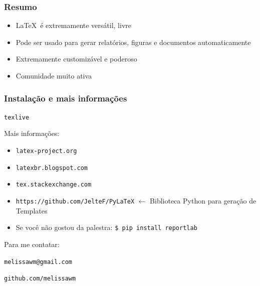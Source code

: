 \documentclass{beamer}
\begin{document}
\begin{frame}
   \frametitle{Resumo}
   \begin{itemize}
      \item \LaTeX\ é extremamente versátil, livre
      \item<2-> Pode ser usado para gerar relatórios, figuras e documentos automaticamente
      \item<3-> Extremamente customizável e poderoso
      \item<4-> Comunidade muito ativa
   \end{itemize}
\end{frame}
\begin{frame}[fragile]
   \frametitle{Instalação e mais informações}
   \begin{center}
      \verb+texlive+
   \end{center}
   Mais informações:
   \begin{itemize}
      \item \verb+latex-project.org+
      \item \verb+latexbr.blogspot.com+
      \item \verb+tex.stackexchange.com+
      \item \verb+https://github.com/JelteF/PyLaTeX+ $\leftarrow$ Biblioteca Python para geração de Templates
      \item<2> \alert{Se você não gostou da palestra:} \verb+$ pip install reportlab+
   \end{itemize}
   Para me contatar:
   \begin{center}
   \verb+melissawm@gmail.com+

   \verb+github.com/melissawm+
   \end{center}
\end{frame}
\end{document}
